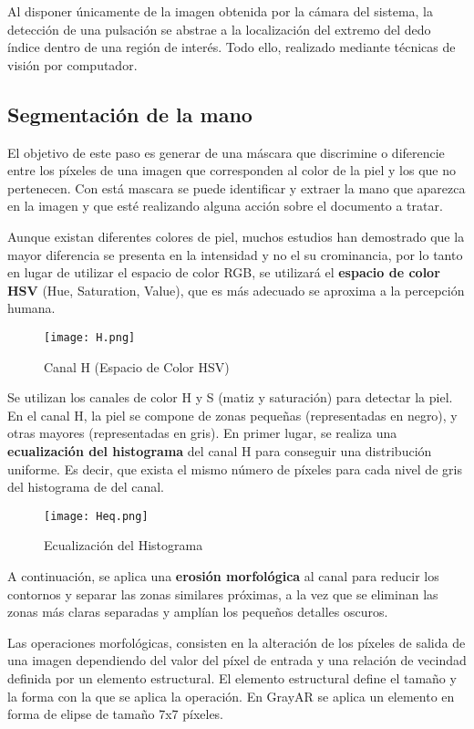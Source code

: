 Al disponer únicamente de la imagen obtenida por la cámara del
sistema, la detección de una pulsación se abstrae a la localización
del extremo del dedo índice dentro de una región de interés. Todo
ello, realizado mediante técnicas de visión por computador.

\subsection{Segmentación de la mano}
El objetivo de este paso es generar de una máscara que discrimine o
diferencie entre los píxeles de una imagen que corresponden al color
de la piel y los que no pertenecen. Con está mascara se puede identificar y extraer la mano que
aparezca en la imagen y que esté realizando alguna acción sobre el documento a tratar.


Aunque existan diferentes colores de piel, muchos estudios han
demostrado que la mayor diferencia se presenta en la intensidad y no
el su crominancia, por lo tanto en lugar de utilizar el espacio de
color RGB, se utilizará el  \textbf{espacio de color HSV} (Hue, Saturation,
Value), que es más adecuado se aproxima a la percepción humana.

 \begin{figure}
    \centering
    \texttt{[image: H.png]}
    \caption{Canal H (Espacio de Color HSV)}
    \label{fig:H}
  \end{figure}

Se utilizan los canales de color H y S (matiz y saturación) para
detectar la piel. En el canal H, la piel se compone de zonas pequeñas
(representadas en negro), y otras mayores (representadas en gris). En
primer lugar, se realiza una \textbf{ecualización del histograma} del canal H
para conseguir una distribución uniforme. Es decir, que exista el
mismo número de píxeles para cada nivel de gris del histograma de del
canal.
 

  \begin{figure} 
    \centering
    \texttt{[image: Heq.png]}
    \caption{Ecualización del Histograma}
    \label{fig:Heq}
  \end{figure}


A continuación, se aplica una \textbf{erosión morfológica} al canal para reducir los
contornos y separar las zonas similares próximas, a la vez que se
eliminan las zonas más claras separadas y amplían los pequeños detalles
oscuros.

Las operaciones morfológicas, consisten en la alteración de los píxeles
de salida de una imagen dependiendo del valor del píxel de entrada y
una relación de vecindad definida por un elemento estructural. El
elemento estructural define el tamaño y la forma con la que se aplica
la operación. En GrayAR se aplica un elemento en forma de elipse de
tamaño 7x7 píxeles.

